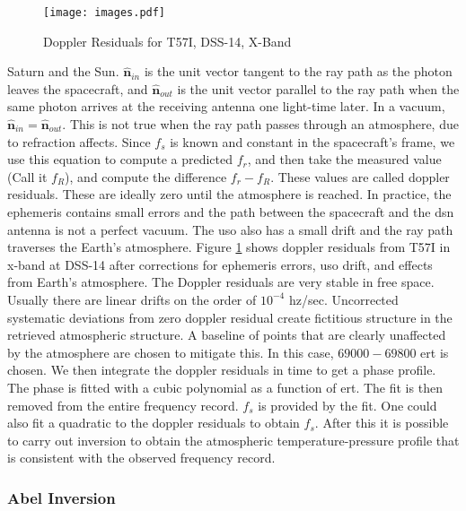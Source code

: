 \documentclass{article}
\theoremstyle{mystyle}
\begin{document}
\begin{figure}
	\centering
    \vspace{-3ex}
	\texttt{[image: images.pdf]}
	\caption{Doppler Residuals for T57I, DSS-14, X-Band}
	\label{fig:usr_doppler_resid_titan_t57I_dss14_x}
\end{figure}

\noindent Saturn and the Sun. $\hat{\mathbf{n}}_{in}$ is the unit vector tangent to the ray path as the photon leaves the spacecraft, and $\hat{\mathbf{n}}_{out}$ is the unit vector parallel to the ray path when the same photon arrives at the receiving antenna one light-time later. In a vacuum, $\hat{\mathbf{n}}_{in} = \hat{\mathbf{n}}_{out}$. This is not true when the ray path passes through an atmosphere, due to \gls{refraction} affects. Since $f_{s}$ is known and constant in the spacecraft's frame, we use this equation to compute a predicted $f_r$, and then take the measured value (Call it $f_{R}$), and compute the difference $f_r - f_{R}$. These values are called \glspl{doppler residual}. These are ideally zero until the atmosphere is reached. In practice, the \gls{ephemeris} contains small errors and the path between the spacecraft and the \gls{dsn} antenna is not a perfect vacuum. The \gls{uso} also has a small drift and the ray path traverses the Earth's atmosphere. Figure \ref{fig:usr_doppler_resid_titan_t57I_dss14_x} shows \glspl{doppler residual} from T57I in \gls{x-band} at DSS-14 after corrections for \gls{ephemeris} errors, \gls{uso} drift, and effects from Earth's atmosphere. The Doppler residuals are very stable in free space. Usually there are linear drifts on the order of $10^{-4}$ \gls{hz}/sec. Uncorrected systematic deviations from zero \gls{doppler residual} create fictitious structure in the retrieved atmospheric structure. A baseline of points that are clearly unaffected by the atmosphere are chosen to mitigate this. In this case, $69000 - 69800$ \gls{ert} is chosen. We then integrate the \glspl{doppler residual} in time to get a phase profile. The phase is fitted with a cubic polynomial as a function of \gls{ert}. The fit is then removed from the entire frequency record. $f_{s}$ is provided by the fit. One could also fit a quadratic to the \glspl{doppler residual} to obtain $f_{s}$. After this it is possible to carry out inversion to obtain the atmospheric \gls{temperature-pressure profile} that is consistent with the observed frequency record.

\subsubsection{\footnotesize Abel Inversion}
\end{document}
